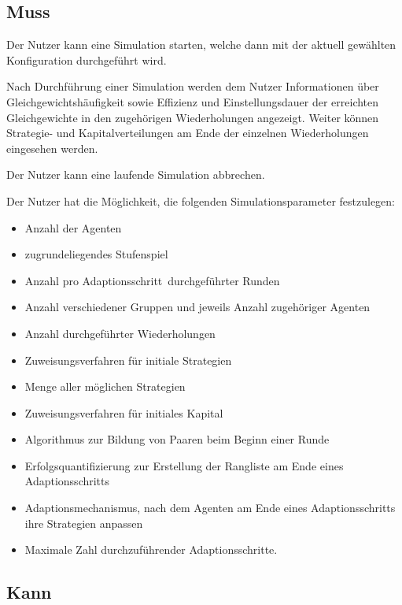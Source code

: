 \documentclass[parskip=full,11pt]{scrartcl}
\def\adapt{Adaptionsschritt}
\def\adapts{Adaptionsschritte}
\begin{document}
\subsection{Muss}


Der Nutzer kann eine Simulation starten, welche dann mit der aktuell gewählten Konfiguration durchgeführt wird.


Nach Durchführung einer Simulation werden dem Nutzer Informationen über Gleichgewichtshäufigkeit sowie Effizienz und Einstellungsdauer der erreichten Gleichgewichte in den zugehörigen Wiederholungen angezeigt. Weiter können Strategie- und Kapitalverteilungen am Ende der einzelnen Wiederholungen eingesehen werden.


Der Nutzer kann eine laufende Simulation abbrechen.


Der Nutzer hat die Möglichkeit, die folgenden Simulationsparameter festzulegen:
\begin{itemize} \itemsep -10pt
\item Anzahl der Agenten
\item zugrundeliegendes Stufenspiel
\item Anzahl pro \adapt\ durchgeführter Runden
\item Anzahl verschiedener Gruppen und jeweils Anzahl zugehöriger Agenten
\item Anzahl durchgeführter Wiederholungen
\item Zuweisungsverfahren für initiale Strategien
\item Menge aller möglichen Strategien
\item Zuweisungsverfahren für initiales Kapital
\item Algorithmus zur Bildung von Paaren beim Beginn einer Runde
\item Erfolgsquantifizierung zur Erstellung der Rangliste am Ende eines \adapt s
\item Adaptionsmechanismus, nach dem Agenten am Ende eines \adapt s ihre Strategien anpassen
\item Maximale Zahl durchzuführender \adapts.
\end{itemize}

\subsection{Kann}
\end{document}

